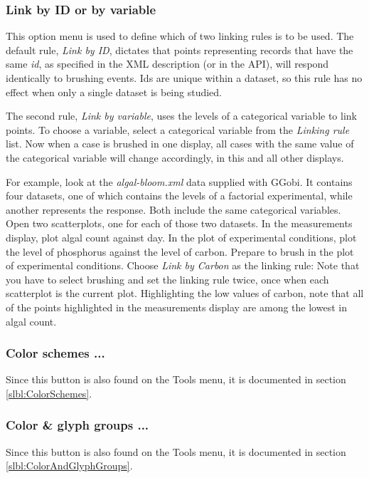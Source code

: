 \documentclass[11pt]{article}
\begin{document}
\subsubsection{Link by ID or by variable}
\label{LinkingRules}

This option menu is used to define which of two linking rules is to
be used.  The default rule, {\it Link by ID}, dictates that points
representing records that have the same {\it id}, as specified in the XML
description (or in the API), will respond identically to brushing events.
Ids are unique within a dataset, so this rule has no effect when only
a single dataset is being studied.

The second rule, {\it Link by variable}, uses the levels of a
categorical variable to link points.  To choose a variable, select a
categorical variable from the {\it Linking rule} list.  Now when a
case is brushed in one display, all cases with the same value of the
categorical variable will change accordingly, in this and all other
displays.

For example, look at the {\em algal-bloom.xml} data supplied with
GGobi.  It contains four datasets, one of which contains the levels of
a factorial experimental, while another represents the response.  Both
include the same categorical variables.  Open two scatterplots, one
for each of those two datasets.  In the measurements display, plot
algal count against day.  In the plot of experimental conditions, plot
the level of phosphorus against the level of carbon.  Prepare to brush
in the plot of experimental conditions.  Choose {\it Link by Carbon}
as the linking rule: Note that you have to select brushing and set the
linking rule twice, once when each scatterplot is the current plot.
Highlighting the low values of carbon, note that all of the points
highlighted in the measurements display are among the lowest in algal
count.

\subsubsection{Color schemes ...}

Since this button is also found on the Tools menu, it is
documented in section \ref{slbl:ColorSchemes}.

\subsubsection{Color \& glyph groups ...}

Since this button is also found on the Tools menu, it is
documented in section \ref{slbl:ColorAndGlyphGroups}.
\end{document}
